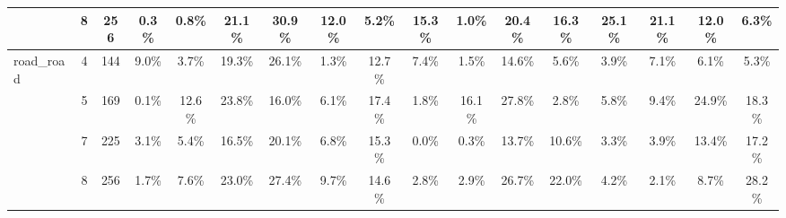 \begin{tabular}[c]{| l | c | c | c | c | c | c | c | c | c | c | c | c | c | c | c | c |}
 & 8 & 256 & 0.3\%  & 0.8\%  & 21.1\%  & 30.9\%  & 12.0\%  & 5.2\%  & 15.3\%  & 1.0\%  & 20.4\%  & 16.3\%  & 25.1\%  & 21.1\%  & 12.0\%  & 6.3\%   \\ \hline
\multirow{4}{*}{road\_road}  & 4 & 144 & 9.0\%  & 3.7\%  & 19.3\%  & 26.1\%  & 1.3\%  & 12.7\%  & 7.4\%  & 1.5\%  & 14.6\%  & 5.6\%  & 3.9\%  & 7.1\%  & 6.1\%  & 5.3\%   \\ \cline{2-17}
 & 5 & 169 & 0.1\%  & 12.6\%  & 23.8\%  & 16.0\%  & 6.1\%  & 17.4\%  & 1.8\%  & 16.1\%  & 27.8\%  & 2.8\%  & 5.8\%  & 9.4\%  & 24.9\%  & 18.3\%   \\ \cline{2-17}
 & 7 & 225 & 3.1\%  & 5.4\%  & 16.5\%  & 20.1\%  & 6.8\%  & 15.3\%  & 0.0\%  & 0.3\%  & 13.7\%  & 10.6\%  & 3.3\%  & 3.9\%  & 13.4\%  & 17.2\%   \\ \cline{2-17}
 & 8 & 256 & 1.7\%  & 7.6\%  & 23.0\%  & 27.4\%  & 9.7\%  & 14.6\%  & 2.8\%  & 2.9\%  & 26.7\%  & 22.0\%  & 4.2\%  & 2.1\%  & 8.7\%  & 28.2\%   \\ \hline
\end{tabular}